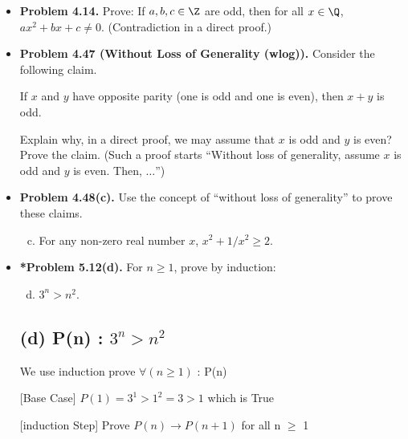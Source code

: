 \documentclass[11pt]{article}
\def\imp{\rightarrow}
\begin{document}
\begin{itemize}
\vspace{0.1in}

\item \textbf{Problem 4.14.}
  Prove: If $a,b,c\in\Z$ are odd, then for all $x\in\Q$,
  $ax^2+bx+c\ne 0$.
  (Contradiction in a direct proof.)

\newpage


\item \textbf{Problem 4.47 (Without Loss of Generality (wlog)).}
  Consider the following claim.
  \begin{center}
  If $x$ and $y$ have opposite parity (one is odd and one is even),
  then $x+y$ is odd.
  \end{center}
  Explain why, in a direct proof, we may assume that $x$ is odd and $y$ is even?
  Prove the claim.
  (Such a proof starts ``Without loss of generality, assume $x$ is odd and $y$ is even.
  Then, $\ldots$'')

\vspace{0.1in}

\item \textbf{Problem 4.48(c).}
  Use the concept of ``without loss of generality'' to prove these claims.
  \begin{enumerate}[(a)]
  \setcounter{enumi}{2}
  \item For any non-zero real number $x$, $x^2+1/x^2\ge 2$.
  \end{enumerate}

\vspace{0.1in}


\item \textbf{*Problem 5.12(d).}
  For $n\ge 1$, prove by induction:
  \begin{enumerate}[(a)]
  \setcounter{enumi}{3}
  \item $3^n>n^2$.
  \end{enumerate}

  \subsection*{(d) P(n) : \(3^n > n^2\)}
  We use induction prove $\forall(n \geq 1)$ : P(n)
  
  [Base Case] $P(1) = 3^1 > 1^2 = 3 > 1$ which is True

  [induction Step] Prove $P(n) \imp P(n+1)$ for all n $\geq$ 1 


\end{itemize}
\end{document}
